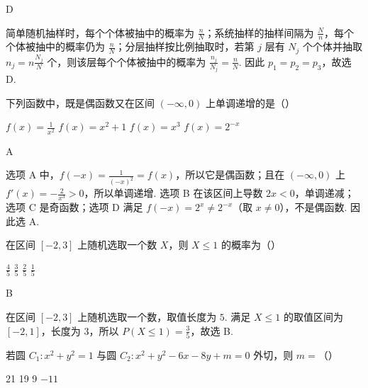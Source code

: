 \begin{answer}
D
\end{answer}

\begin{solution}
简单随机抽样时，每个个体被抽中的概率为 \(\frac{n}{N}\)；系统抽样的抽样间隔为 \(\frac{N}{n}\)，每个个体被抽中的概率仍为 \(\frac{n}{N}\)；分层抽样按比例抽取时，若第 \(j\) 层有 \(N_j\) 个个体并抽取 \(n_j=n\frac{N_j}{N}\) 个，则该层每个个体被抽中的概率为 \(\frac{n_j}{N_j}=\frac{n}{N}\). 因此 \(p_1=p_2=p_3\)，故选 D.
\end{solution}

\begin{problem}
下列函数中，既是偶函数又在区间 \((- \infty, 0)\) 上单调递增的是（\quad）

\choices
    {\(f(x) = \frac{1}{x^{2}}\)}
    {\(f(x) = x^{2} + 1\)}
    {\(f(x) = x^{3}\)}
    {\(f(x) = 2^{-x}\)}
\end{problem}

\begin{answer}
A
\end{answer}

\begin{solution}
选项 A 中，\(f(-x)=\frac{1}{(-x)^2}=f(x)\)，所以它是偶函数；且在 \((-\infty,0)\) 上 \(f'(x)=-\frac{2}{x^3}>0\)，所以单调递增. 选项 B 在该区间上导数 \(2x<0\)，单调递减；选项 C 是奇函数；选项 D 满足 \(f(-x)=2^x\neq2^{-x}\)（取 \(x\neq0\)），不是偶函数. 因此选 A.
\end{solution}

\begin{problem}
在区间 \([-2,3]\) 上随机选取一个数 \(X\)，则 \(X \leqslant 1\) 的概率为（\quad）

\choices
    {\(\frac{4}{5}\)}
    {\(\frac{3}{5}\)}
    {\( \frac{2}{5} \)}
    {\(\frac{1}{5}\)}
\end{problem}

\begin{answer}
B
\end{answer}

\begin{solution}
在区间 \([-2,3]\) 上随机选取一个数，取值长度为 \(5\). 满足 \(X\leqslant1\) 的取值区间为 \([-2,1]\)，长度为 \(3\)，所以 \(P(X\leqslant1)=\frac{3}{5}\)，故选 B.
\end{solution}

\begin{problem}
若圆 \(C_1: x^2 + y^2 = 1\) 与圆 \(C_2: x^2 + y^2 - 6x - 8y + m = 0\) 外切，则 \(m =\)（\quad）

\choices
    {21}
    {19}
    {9}
    {\(-11\)}
\end{problem}


